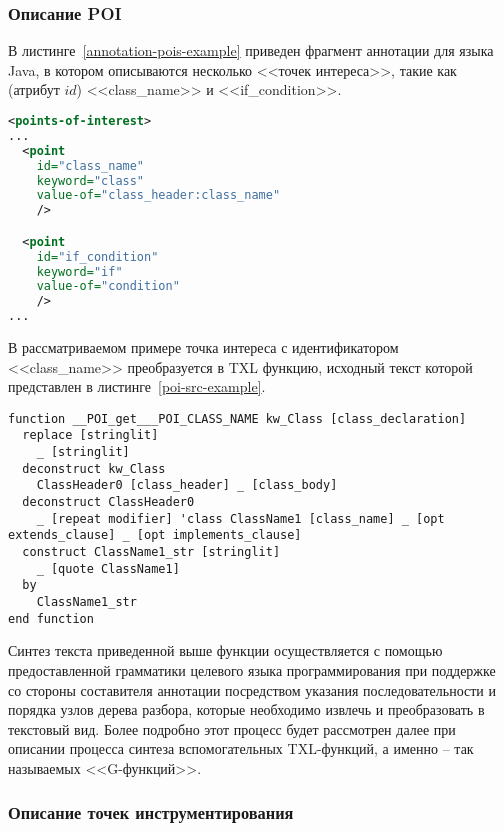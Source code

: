 \subsubsection{Описание POI}

В листинге~\ref{annotation-pois-example} приведен фрагмент аннотации для языка Java, в котором описываются несколько <<точек интереса>>, такие как (атрибут $id$) <<class\_name>> и <<if\_condition>>.

\begin{lstlisting}[frame=single, language=XML, label={annotation-pois-example}, caption={Пример описания <<точек интереса>>.}]
<points-of-interest>
...
  <point
    id="class_name"
    keyword="class"
    value-of="class_header:class_name"
    />

  <point
    id="if_condition"
    keyword="if"
    value-of="condition"
    />
...
\end{lstlisting}

В рассматриваемом примере точка интереса с идентификатором <<class\_name>> преобразуется в TXL функцию, исходный текст которой представлен в листинге~\ref{poi-src-example}.

\begin{lstlisting}[frame=single, language=TXL, label={poi-src-example}, caption={Пример синтезированной функции для точки интереса <<class\_name>>.}]
function __POI_get___POI_CLASS_NAME kw_Class [class_declaration]
  replace [stringlit]
    _ [stringlit]
  deconstruct kw_Class
    ClassHeader0 [class_header] _ [class_body]
  deconstruct ClassHeader0
    _ [repeat modifier] 'class ClassName1 [class_name] _ [opt extends_clause] _ [opt implements_clause]
  construct ClassName1_str [stringlit]
    _ [quote ClassName1]
  by
    ClassName1_str
end function
\end{lstlisting}

Синтез текста приведенной выше функции осуществляется с помощью предоставленной грамматики целевого языка программирования при поддержке со стороны составителя аннотации посредством указания последовательности и порядка узлов дерева разбора, которые необходимо извлечь и преобразовать в текстовый вид.
Более подробно этот процесс будет рассмотрен далее при описании процесса синтеза вспомогательных TXL-функций, а именно -- так называемых <<G-функций>>.

\subsubsection{Описание точек инструментирования}

